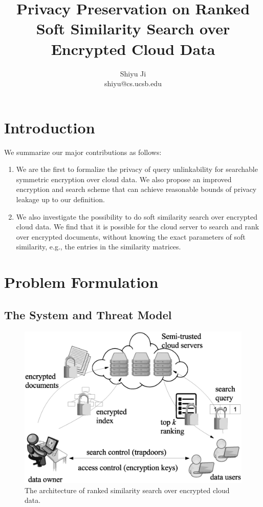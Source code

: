 \documentclass{IEEEtran}
\begin{document}
\title{\Large\bf Privacy Preservation on Ranked Soft Similarity Search over Encrypted Cloud Data}
\author{Shiyu Ji\\ shiyu@cs.ucsb.edu}
\date{}
\maketitle

\newtheorem{definition}{Definition}
\theoremstyle{definition}
\newtheorem{theorem}{Theorem}
\theoremstyle{plain}
\newtheorem{lemma}{Lemma}
\theoremstyle{plain}
\newtheorem{corollary}{Corollary}
\theoremstyle{plain}

\section{Introduction}

We summarize our major contributions as follows:
\begin{enumerate}
\item We are the first to formalize the privacy of query unlinkability for searchable symmetric encryption over cloud data. We also propose an improved encryption and search scheme that can achieve reasonable bounds of privacy leakage up to our definition.
\item We also investigate the possibility to do soft similarity search over encrypted cloud data. We find that it is possible for the cloud server to search and rank over encrypted documents, without knowing the exact parameters of soft similarity, e.g., the entries in the similarity matrices.
\end{enumerate}

\section{Problem Formulation}
\subsection{The System and Threat Model}

\begin{figure}
\centering
\includegraphics[width=0.8\linewidth]{system_model.eps}
\caption{The architecture of ranked similarity search over encrypted cloud data.}
\label{fig:system_model}
\end{figure}
\end{document}

